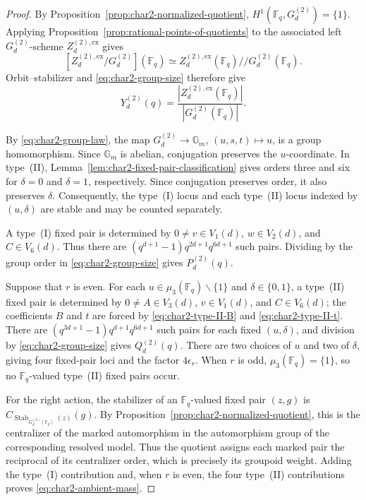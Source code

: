 \documentclass[a4paper,12pt]{amsart}
\theoremstyle{definition}
\newcommand{\Fb}{\mathbb{F}}
\newcommand{\Gb}{\mathbb{G}}
\renewcommand{\setminus}{\smallsetminus}
\begin{document}
\begin{proof}
By Proposition~\ref{prop:char2-normalized-quotient}, $H^1(\Fb_q,G_d^{(2)})=\{1\}$.  Applying Proposition~\ref{prop:rational-points-of-quotients} to the associated left $G_d^{(2)}$-scheme $Z_d^{(2),\mathrm{ex}}$ gives
\[
[Z_d^{(2),\mathrm{ex}}/G_d^{(2)}](\Fb_q)
\simeq
Z_d^{(2),\mathrm{ex}}(\Fb_q)\mathbin{//}G_d^{(2)}(\Fb_q).
\]
Orbit--stabilizer and \eqref{eq:char2-group-size} therefore give
\[
Y_d^{(2)}(q)
=
\frac{|Z_d^{(2),\mathrm{ex}}(\Fb_q)|}{|G_d^{(2)}(\Fb_q)|}.
\]

By \eqref{eq:char2-group-law}, the map $G_d^{(2)}\to\Gb_m$, $(u,s,t)\mapsto u$, is a group homomorphism.  Since $\Gb_m$ is abelian, conjugation preserves the $u$-coordinate.  In type~\textup{(II)}, Lemma~\ref{lem:char2-fixed-pair-classification} gives orders three and six for $\delta=0$ and $\delta=1$, respectively.  Since conjugation preserves order, it also preserves $\delta$.  Consequently, the type~\textup{(I)} locus and each type~\textup{(II)} locus indexed by $(u,\delta)$ are stable and may be counted separately.

A type~(I) fixed pair is determined by $0\neq v\in V_1(d)$, $w\in V_2(d)$, and $C\in V_6(d)$.  Thus there are $(q^{d+1}-1)q^{2d+1}q^{6d+1}$ such pairs.  Dividing by the group order in \eqref{eq:char2-group-size} gives $P_d^{(2)}(q)$.

Suppose that $r$ is even.  For each $u\in\mu_3(\Fb_q)\setminus\{1\}$ and $\delta\in\{0,1\}$, a type~(II) fixed pair is determined by $0\neq A\in V_3(d)$, $v\in V_1(d)$, and $C\in V_6(d)$; the coefficients $B$ and $t$ are forced by \eqref{eq:char2-type-II-B} and \eqref{eq:char2-type-II-t}.  There are $(q^{3d+1}-1)q^{d+1}q^{6d+1}$ such pairs for each fixed $(u,\delta)$, and division by \eqref{eq:char2-group-size} gives $Q_d^{(2)}(q)$.  There are two choices of $u$ and two of $\delta$, giving four fixed-pair loci and the factor $4\epsilon_r$.  When $r$ is odd, $\mu_3(\Fb_q)=\{1\}$, so no $\Fb_q$-valued type~(II) fixed pairs occur.

For the right action, the stabilizer of an $\Fb_q$-valued fixed pair $(z,g)$ is $C_{\operatorname{Stab}_{G_d^{(2)}(\Fb_q)}(z)}(g)$.  By Proposition~\ref{prop:char2-normalized-quotient}, this is the centralizer of the marked automorphism in the automorphism group of the corresponding resolved model.  Thus the quotient assigns each marked pair the reciprocal of its centralizer order, which is precisely its groupoid weight.  Adding the type~(I) contribution and, when $r$ is even, the four type~(II) contributions proves \eqref{eq:char2-ambient-mass}.
\end{proof}
\end{document}
